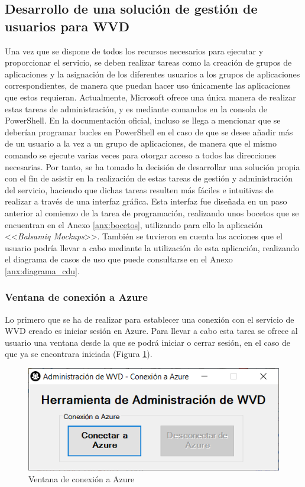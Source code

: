 \clearpage

\subsection{Desarrollo de una solución de gestión de usuarios para \acs{WVD}}
Una vez que se dispone de todos los recursos necesarios para ejecutar y proporcionar el servicio, se deben realizar tareas como la creación de grupos de aplicaciones y la asignación de los diferentes usuarios a los grupos de aplicaciones correspondientes, de manera que puedan hacer uso únicamente las aplicaciones que estos requieran. Actualmente, Microsoft ofrece una única manera de realizar estas tareas de administración, y es mediante comandos en la consola de PowerShell. En la documentación oficial, incluso se llega a mencionar que se deberían programar bucles en PowerShell en el caso de que se desee añadir más de un usuario a la vez a un grupo de aplicaciones, de manera que el mismo comando se ejecute varias veces para otorgar acceso a todos las direcciones necesarias. Por tanto, se ha tomado la decisión de desarrollar una solución propia con el fin de asistir en la realización de estas tareas de gestión y administración del servicio, haciendo que dichas tareas resulten más fáciles e intuitivas de realizar a través de una interfaz gráfica. Esta interfaz fue diseñada en un paso anterior al comienzo de la tarea de programación, realizando unos bocetos que se encuentran en el Anexo \ref{anx:bocetos}, utilizando para ello la aplicación <<\textit{Balsamiq Mockups}>>. También se tuvieron en cuenta las acciones que el usuario podría llevar a cabo mediante la utilización de esta aplicación, realizando el diagrama de casos de uso que puede consultarse en el Anexo \ref{anx:diagrama_cdu}.

\subsubsection{Ventana de conexión a Azure}
Lo primero que se ha de realizar para establecer una conexión con el servicio de \acs{WVD} creado es iniciar sesión en Azure. Para llevar a cabo esta tarea se ofrece al usuario una ventana desde la que se podrá iniciar o cerrar sesión, en el caso de que ya se encontrara iniciada (Figura \ref{fig:main_conex}).

\begin{figure}[h]
  \centering
  \includegraphics[width=0.7\linewidth]{figures/images/script/main_conex.PNG}
  \caption{Ventana de conexión a Azure}
  \label{fig:main_conex}
\end{figure}


